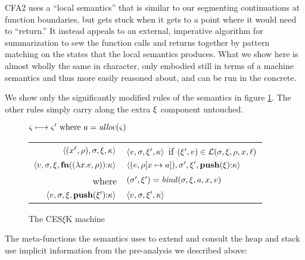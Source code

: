 CFA2 uses a ``local semantics'' that is similar to our segmenting continuations at function boundaries, but gets stuck when it gets to a point where it would need to ``return.''
%
It instead appeals to an external, imperative algorithm for summarization to sew the function calls and returns together by pattern matching on the states that the local semantics produces.
%
What we show here is almost wholly the same in character, only embodied still in terms of a machine semantics and thus more easily reasoned about, and can be run in the concrete.

We show only the significantly modified rules of the semantics in figure \ref{fig:frame-semantics}.
%
The other rules simply carry along the extra $\mframe$ component untouched.
\begin{figure}
  \centering
  $\mstate \stepto \mstate' \text{ where } \maddr = \alloc(\mstate)$ \\
  \begin{tabular}{r|l}
    \hline
    $\tpl{(\svar[\mlab]{\mvar}, \menv), \mstore, \mframe, \mkont}$
    &
    $\tpl{\mval,\mstore,\mframe',\mkont}$ if $(\mframe', \mval) \in \lookup(\mstore,\mframe,\menv,\mvar,\mlab)$
    \\
    $\tpl{\mval,\mstore,\mframe,\kcons{\kfn{\vclo{\slam{\mvar}{\mexpr}}{\menv}}}{\mkont}}$
    &
    $\tpl{(\mexpr, \extm{\menv}{\mvar}{\maddr}), \mstore', \mframe', \kcons{\kpush{\mframe}}{\mkont}}$
    \\ where & $(\mstore',\mframe') = \bind(\mstore,\mframe,\maddr,\mvar,\mval)$
    \\
    $\tpl{\mval,\mstore,\mframe,\kcons{\kpush{\mframe'}}{\mkont}}$
    &
    $\tpl{\mval,\mstore,\mframe',\mkont}$
  \end{tabular}
  \caption{The CES$\xi$K machine}
  \label{fig:frame-semantics}
\end{figure}

The meta-functions the semantics uses to extend and consult the heap
and stack use implicit information from the pre-analysis we described
above:

